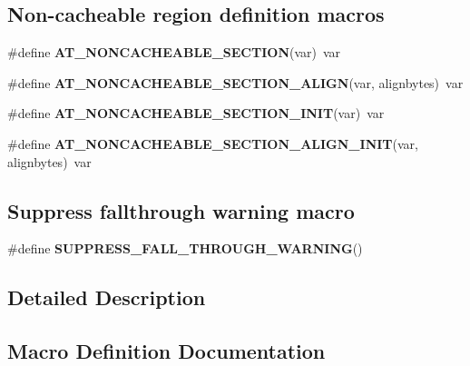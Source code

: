 \subsection*{Non-\/cacheable region definition macros}
\begin{DoxyCompactItemize}
\item 
\mbox{\label{group__ksdk__common_gad98e0c70f9195609e3c3d9e635bc207d}} 
\#define {\bfseries A\+T\+\_\+\+N\+O\+N\+C\+A\+C\+H\+E\+A\+B\+L\+E\+\_\+\+S\+E\+C\+T\+I\+ON}(var)~var
\item 
\mbox{\label{group__ksdk__common_ga545036768d164aad61b71502371e7165}} 
\#define {\bfseries A\+T\+\_\+\+N\+O\+N\+C\+A\+C\+H\+E\+A\+B\+L\+E\+\_\+\+S\+E\+C\+T\+I\+O\+N\+\_\+\+A\+L\+I\+GN}(var,  alignbytes)~var
\item 
\mbox{\label{group__ksdk__common_ga0e6dbf5a33f2390db8f141f2df5055aa}} 
\#define {\bfseries A\+T\+\_\+\+N\+O\+N\+C\+A\+C\+H\+E\+A\+B\+L\+E\+\_\+\+S\+E\+C\+T\+I\+O\+N\+\_\+\+I\+N\+IT}(var)~var
\item 
\mbox{\label{group__ksdk__common_ga5861db7ec245a076dbb525bb75255cf0}} 
\#define {\bfseries A\+T\+\_\+\+N\+O\+N\+C\+A\+C\+H\+E\+A\+B\+L\+E\+\_\+\+S\+E\+C\+T\+I\+O\+N\+\_\+\+A\+L\+I\+G\+N\+\_\+\+I\+N\+IT}(var,  alignbytes)~var
\end{DoxyCompactItemize}
\subsection*{Suppress fallthrough warning macro}
\begin{DoxyCompactItemize}
\item 
\mbox{\label{group__ksdk__common_ga0b47cb52d1ceba88ee3e6cd19820ecfc}} 
\#define {\bfseries S\+U\+P\+P\+R\+E\+S\+S\+\_\+\+F\+A\+L\+L\+\_\+\+T\+H\+R\+O\+U\+G\+H\+\_\+\+W\+A\+R\+N\+I\+NG}()
\end{DoxyCompactItemize}


\subsection{Detailed Description}


\subsection{Macro Definition Documentation}
\mbox{\label{group__ksdk__common_gafa0fe6bd95d5455c99aee949cb285b20}} 
